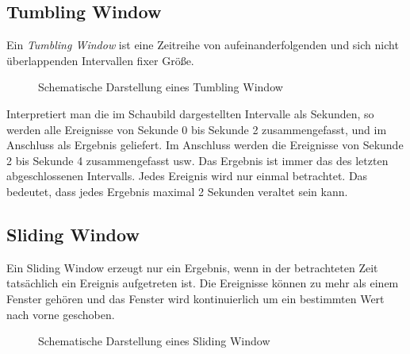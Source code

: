 \documentclass[a4paper,11pt]{scrartcl}
\begin{document}
  \subsection{Tumbling Window}
  Ein \textit{Tumbling Window} ist eine Zeitreihe von
  aufeinanderfolgenden und sich nicht überlappenden Intervallen fixer
  Größe.
  \begin{figure}[!h]
    \centering
    \caption{Schematische Darstellung eines Tumbling Window}
  \end{figure}

  Interpretiert man die im Schaubild dargestellten Intervalle als
  Sekunden, so werden alle Ereignisse von Sekunde 0 bis Sekunde 2
  zusammengefasst, und im Anschluss als Ergebnis geliefert. Im
  Anschluss werden die Ereignisse von Sekunde 2 bis Sekunde 4
  zusammengefasst usw. Das Ergebnis ist immer das des letzten
  abgeschlossenen Intervalls. Jedes Ereignis wird nur einmal
  betrachtet. Das bedeutet, dass jedes Ergebnis maximal 2 Sekunden
  veraltet sein kann.

  \subsection{Sliding Window}
  Ein Sliding Window erzeugt nur ein Ergebnis, wenn in der
  betrachteten Zeit tatsächlich ein Ereignis aufgetreten ist. Die
  Ereignisse können zu mehr als einem Fenster gehören und das Fenster
  wird kontinuierlich um ein bestimmten Wert nach vorne
  geschoben.\cite[S.~472]{kleppmann17}
  \begin{figure}[!h]
    \centering
    \caption{Schematische Darstellung eines Sliding Window}
  \end{figure}
\end{document}

